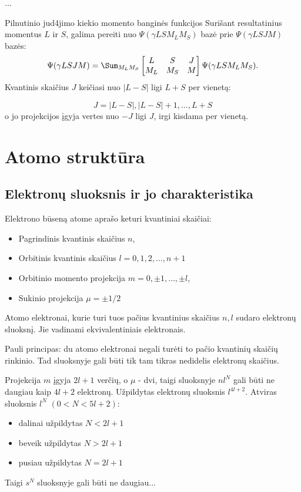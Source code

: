 ...

Pilnutinio jud4jimo kiekio momento banginės funkcijos
Surišant resultatinius momentus $L$ ir $S$, galima pereiti nuo $\Psi(\gamma LSM_LM_S)$ bazė prie $\Psi(\gamma LSJM)$ bazės:
\begin{equation*}
    \Psi(\gamma LSJM) = \Sum_{M_L M_S}
    \begin{bmatrix*}[c]
        L & S & J \\
        M_L & M_S & M
    \end{bmatrix*}
    \Psi(\gamma LSM_L M_S).
\end{equation*}
Kvantinis skaičius $J$ keičiasi nuo $|L-S|$ ligi $L+S$ per vienetą:

\begin{equation*}
    J = |L-S|, |L-S| + 1, \dots, L+S
\end{equation*}
o jo projekcijos įgyja vertes nuo $-J$ ligi $J$, irgi kisdama per vienetą.


\section{Atomo struktūra}

\subsection*{Elektronų sluoksnis ir jo charakteristika}
Elektrono būseną atome aprašo keturi kvantiniai skaičiai:
\begin{itemize}
    \item Pagrindinis kvantinis skaičius $n$,
    \item Orbitinis kvantinis skaičius $l = 0,1,2, \dots, n+1$
    \item Orbitinio momento projekcija $m=0, \pm 1, \dots , \pm l$,
    \item Sukinio projekcija $\mu = \pm 1/2$
\end{itemize}

Atomo elektronai, kurie turi tuos pačius kvantinius skaičius $n,l$ sudaro elektronų sluoksnį. Jie vadinami ekvivalentiniais elektronais.

Pauli principas: du atomo elektronai negali turėti to pačio kvantinių skaičių rinkinio. Tad sluoksnyje gali būti tik tam tikras nedidelis elektronų skaičius.

Projekcija $m$ įgyja $2l+1$ verčių, o $\mu$ - dvi, taigi sluoksnyje $nl^{N}$ gali būti ne daugiau kaip $4l+2$ elektronų. Užpildytas elektronų sluoksnis $l^{4l+2}$. Atviras sluoksnis $l^{N}$ $(0 < N < 5l+2)$:
\begin{itemize}
    \item dalinai užpildytas $N < 2l + 1$
    \item beveik užpildytas $N > 2l + 1$
    \item pusiau užpildytas $N = 2l + 1$
\end{itemize}
Taigi $s^N$ sluoksnyje gali būti ne daugiau...

